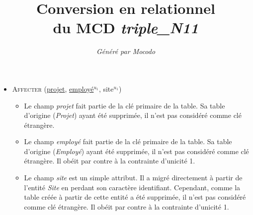 \documentclass[a4paper]{article}
\title{Conversion en relationnel\\du MCD \emph{triple_N11}}
\author{\emph{Généré par Mocodo}}
\newcommand{\relat}[1]{\textsc{#1}}
\newcommand{\attr}[1]{#1}
\newcommand{\prim}[1]{\uline{#1}}
\begin{document}
\maketitle

\begin{itemize}
  \item \relat{Affecter} (\prim{projet}, \prim{employé}$^{u_1}$, \attr{site}$^{u_1}$)
  \begin{itemize}
    \item Le champ \emph{projet} fait partie de la clé primaire de la table. Sa table d'origine (\emph{Projet}) ayant été supprimée, il n'est pas considéré comme clé étrangère.
    \item Le champ \emph{employé} fait partie de la clé primaire de la table. Sa table d'origine (\emph{Employé}) ayant été supprimée, il n'est pas considéré comme clé étrangère. Il obéit par contre à la contrainte d'unicité 1.
    \item Le champ \emph{site} est un simple attribut. Il a migré directement à partir de l'entité \emph{Site} en perdant son caractère identifiant. Cependant, comme la table créée à partir de cette entité a été supprimée, il n'est pas considéré comme clé étrangère. Il obéit par contre à la contrainte d'unicité 1.
  \end{itemize}

\end{itemize}
\end{document}
